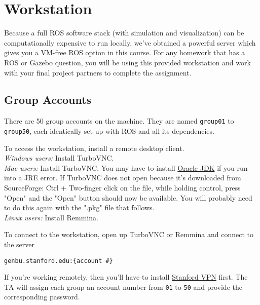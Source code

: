\section{Workstation}
Because a full ROS software stack (with simulation and visualization) can be computationally expensive to run locally, we've obtained a powerful server which gives you a VM-free ROS option in this course. For any homework that has a ROS or Gazebo question, you will be using this provided workstation and work with your final project partners to complete the assignment.


\subsection*{Group Accounts}
There are 50 group accounts on the machine. They are named \texttt{group01} to \texttt{group50}, each identically set up with ROS and all its dependencies.

To access the workstation, install a remote desktop client.\\
\emph{Windows users:} Install TurboVNC.\\
\emph{Mac users:} Install TurboVNC. You may have to install \href{https://www.oracle.com/java/technologies/javase-jdk15-downloads.html}{Oracle JDK} if you run into a JRE error. If TurboVNC does not open because it's downloaded from SourceForge:
Ctrl + Two-finger click on the file, while holding control, press "Open" and the "Open" button should now be available. You will probably need to do this again with the ".pkg" file that follows.\\
\emph{Linux users:} Install Remmina.


To connect to the workstation, open up TurboVNC or Remmina and connect to the server
\begin{lstlisting}
genbu.stanford.edu:{account #}
\end{lstlisting}
If you're working remotely, then you'll have to install \href{https://uit.stanford.edu/service/vpn}{Stanford VPN} first.
The TA will assign each group an account number from \texttt{01} to \texttt{50} and provide the corresponding password.

